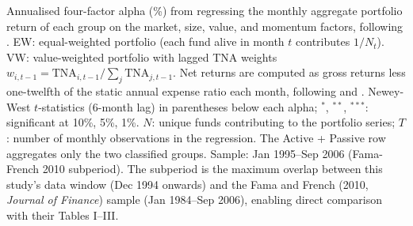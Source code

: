 \begin{table}[!htbp]
\begin{minipage}{\tabletempwidth}
\begin{singlespace}
Annualised \textcite{Carhart1997} four-factor alpha (\%) from regressing the monthly aggregate portfolio return of each group on the market, size, value, and momentum factors, following \textcite{FamaFrench2010}. EW: equal-weighted portfolio (each fund alive in month $t$ contributes $1/N_t$). VW: value-weighted portfolio with lagged TNA weights $w_{i,t-1} = \text{TNA}_{i,t-1} / \sum_j \text{TNA}_{j,t-1}$. Net returns are computed as gross returns less one-twelfth of the static annual expense ratio each month, following \textcite{Carhart1997} and \textcite{Wermers2000}. Newey-West $t$-statistics (6-month lag) in parentheses below each alpha; $^{*}$, $^{**}$, $^{***}$: significant at 10\%, 5\%, 1\%. $N$: unique funds contributing to the portfolio series; $T$: number of monthly observations in the regression. The Active + Passive row aggregates only the two classified groups. Sample: Jan 1995--Sep 2006 (Fama-French 2010 subperiod). The subperiod is the maximum overlap between this study's data window (Dec 1994 onwards) and the Fama and French (2010, \textit{Journal of Finance}) sample (Jan 1984--Sep 2006), enabling direct comparison with their Tables I--III.
\end{singlespace}
\end{minipage}
\end{table}

